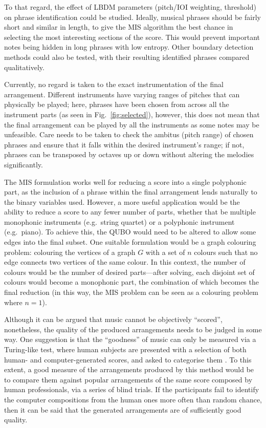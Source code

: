 \documentclass[aps,pra,12pt,onecolumn]{revtex4-2}
\begin{document}
To that regard, the effect of LBDM parameters (pitch/IOI weighting, threshold) on phrase identification could be studied. Ideally, musical phrases should be fairly short and similar in length, to give the MIS algorithm the best chance in selecting the most interesting sections of the score. This would prevent important notes being hidden in long phrases with low entropy. Other boundary detection methods could also be tested, with their resulting identified phrases compared qualitatively.

Currently, no regard is taken to the exact instrumentation of the final arrangement. Different instruments have varying ranges of pitches that can physically be played; here, phrases have been chosen from across all the instrument parts (as seen in Fig.\ \ref{fig:selected}), however, this does not mean that the final arrangement can be played by all the instruments as some notes may be unfeasible. Care needs to be taken to check the ambitus (pitch range) of chosen phrases and ensure that it falls within the desired instrument's range; if not, phrases can be transposed by octaves up or down without altering the melodies significantly.

The MIS formulation works well for reducing a score into a single polyphonic part, as the inclusion of a phrase within the final arrangement lends naturally to the binary variables used. However, a more useful application would be the ability to reduce a score to any fewer number of parts, whether that be multiple monophonic instruments (e.g.\ string quartet) or a polyphonic instrument (e.g.\ piano). To achieve this, the QUBO would need to be altered to allow some edges into the final subset. One suitable formulation would be a graph colouring problem: colouring the vertices of a graph $G$ with a set of $n$ colours such that no edge connects two vertices of the same colour. In this context, the number of colours would be the number of desired parts—after solving, each disjoint set of colours would become a monophonic part, the combination of which becomes the final reduction (in this way, the MIS problem can be seen as a colouring problem where $n=1$).

Although it can be argued that music cannot be objectively ``scored'', nonetheless, the quality of the produced arrangements needs to be judged in some way. One suggestion is that the ``goodness'' of music can only be measured via a Turing-like test, where human subjects are presented with a selection of both human- and computer-generated scores, and asked to categorise them \cite{pearce_towards_2001}. To this extent, a good measure of the arrangements produced by this method would be to compare them against popular arrangements of the same score composed by human professionals, via a series of blind trials. If the participants fail to identify the computer compositions from the human ones more often than random chance, then it can be said that the generated arrangements are of sufficiently good quality.
\end{document}
